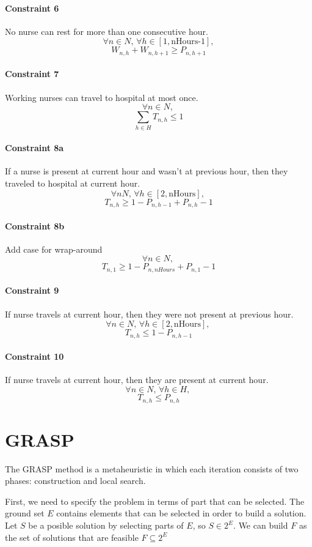 \documentclass[12pt,a4paper]{article}
\begin{document}
\paragraph{Constraint 6} No nurse can rest for more than one consecutive hour.
$$ \forall n \in N,\, \forall h \in [1, \textrm{nHours-1}],$$
$$W_{n, h} + W_{n, h+1} \ge P_{n,h+1} $$
%
\paragraph{Constraint 7} Working nurses can travel to hospital at most once.
$$ \forall n \in N,\,$$
$$ \sum_{h \in H} T_{n,h} \le 1 $$
%
\paragraph{Constraint 8a} If a nurse is present at current hour and wasn't at
previous hour, then they traveled to hospital at current hour.
$$ \forall n N, \,\forall h \in [2, \textrm{nHours}],\,$$
$$ T_{n,h} \ge 1 - P_{n, h-1} + P_{n, h} - 1 $$
%
\paragraph{Constraint 8b} Add case for wrap-around
$$ \forall n \in N,\,$$
$$ T_{n, 1} \ge 1 - P_{n, nHours} + P_{n, 1} - 1 $$
%
\paragraph{Constraint 9} If nurse travels at current hour, then they were not
present at previous hour.
$$ \forall n \in N,\,\forall h \in [2, \textrm{nHours}],\,$$
$$ T_{n,h} \le 1 - P_{n, h-1} $$
%
\paragraph{Constraint 10} If nurse travels at current hour, then they are
present at current hour.
$$ \forall n \in N,\,\forall h \in H,\,$$
$$ T_{n,h} \le P_{n, h} $$
%
%
\section{GRASP}
%
The GRASP method is a metaheuristic in which each iteration consists of two
phases: construction and local search.

First, we need to specify the problem in terms of part that can be selected. The
ground set $E$ contains elements that can be selected in order to build a
solution. Let $S$ be a posible solution by selecting parts of $E$, so $S \in
2^E$. We can build $F$ as the set of solutions that are feasible $F \subseteq
2^E$
\end{document}
